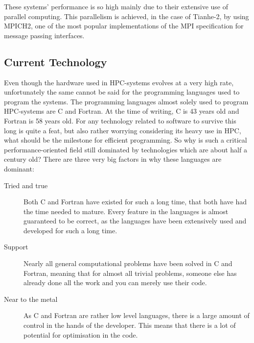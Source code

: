 These systems' performance is so high mainly due to their extensive use of parallel computing. This parallelism is achieved, in the case of Tianhe-2, by using MPICH2, one of the most popular implementations of the MPI specification for message passing interfaces.

\subsection{Current Technology}
Even though the hardware used in HPC-systems evolves at a very high rate, unfortunately the same cannot be said for the programming languages used to program the systems. The programming languages almost solely used to program HPC-systems are C and Fortran. At the time of writing, C is 43 years old and Fortran is 58 years old. For any technology related to software to survive this long is quite a feat, but also rather worrying considering its heavy use in HPC, what should be the milestone for efficient programming.
So why is such a critical performance-oriented field still dominated by technologies which are about half a century old? There are three very big factors in why these languages are dominant:
\begin{description}
	\item [Tried and true]
	Both C and Fortran have existed for such a long time, that both have had the time needed to mature. Every feature in the languages is almost guaranteed to be correct, as the languages have been extensively used and developed for such a long time.
	\item [Support]
	Nearly all general computational problems have been solved in C and Fortran, meaning that for almost all trivial problems, someone else has already done all the work and you can merely use their code.
	\item [Near to the metal]
	As C and Fortran are rather low level languages, there is a large amount of control in the hands of the developer. This means that there is a lot of potential for optimisation in the code.
\end{description}
